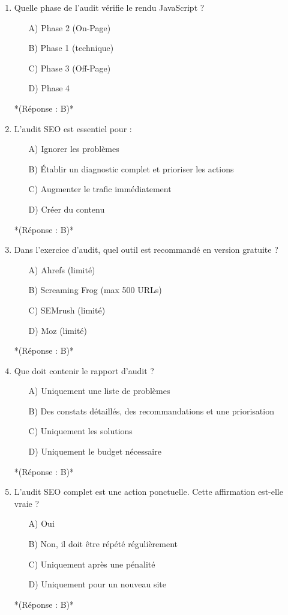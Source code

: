\documentclass[12pt,a4paper,twoside]{report}
\begin{document}
\begin{enumerate}
    \item Quelle phase de l'audit vérifie le rendu JavaScript ?
    \begin{itemize}
        \item[A)] Phase 2 (On-Page)
        \item[B)] Phase 1 (technique)
        \item[C)] Phase 3 (Off-Page)
        \item[D)] Phase 4
    \end{itemize}
    *(Réponse : B)*

    \item L'audit SEO est essentiel pour :
    \begin{itemize}
        \item[A)] Ignorer les problèmes
        \item[B)] Établir un diagnostic complet et prioriser les actions
        \item[C)] Augmenter le trafic immédiatement
        \item[D)] Créer du contenu
    \end{itemize}
    *(Réponse : B)*

    \item Dans l'exercice d'audit, quel outil est recommandé en version gratuite ?
    \begin{itemize}
        \item[A)] Ahrefs (limité)
        \item[B)] Screaming Frog (max 500 URLs)
        \item[C)] SEMrush (limité)
        \item[D)] Moz (limité)
    \end{itemize}
    *(Réponse : B)*

    \item Que doit contenir le rapport d'audit ?
    \begin{itemize}
        \item[A)] Uniquement une liste de problèmes
        \item[B)] Des constats détaillés, des recommandations et une priorisation
        \item[C)] Uniquement les solutions
        \item[D)] Uniquement le budget nécessaire
    \end{itemize}
    *(Réponse : B)*

    \item L'audit SEO complet est une action ponctuelle. Cette affirmation est-elle vraie ?
    \begin{itemize}
        \item[A)] Oui
        \item[B)] Non, il doit être répété régulièrement
        \item[C)] Uniquement après une pénalité
        \item[D)] Uniquement pour un nouveau site
    \end{itemize}
    *(Réponse : B)*


\end{enumerate}
\end{document}
